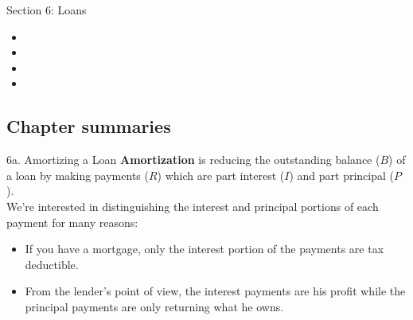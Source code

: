 \begin{ASM_chapter}
Section 6: Loans
\begin{itemize}
	\item	{}
	\item	{}
	\item	{}
	\item	{}
\end{itemize}
\end{ASM_chapter}

\subsection{Chapter summaries}

\begin{CHPT_SUMM_AUTO}[label = {L.-6a}]{6a. Amortizing a Loan}
\textbf{Amortization} is reducing the outstanding balance ($B$) of a loan by making payments ($R$) which are part interest ($I$) and part principal ($P$).\\

We're interested in distinguishing the interest and principal portions of each payment for many reasons:
\begin{itemize}[leftmargin = *]
	\item	If you have a mortgage, only the interest portion of the payments are tax deductible. 
	\item	From the lender's point of view, the interest payments are his profit while the principal payments are only returning what he owns.
\end{itemize}


\end{CHPT_SUMM_AUTO}
